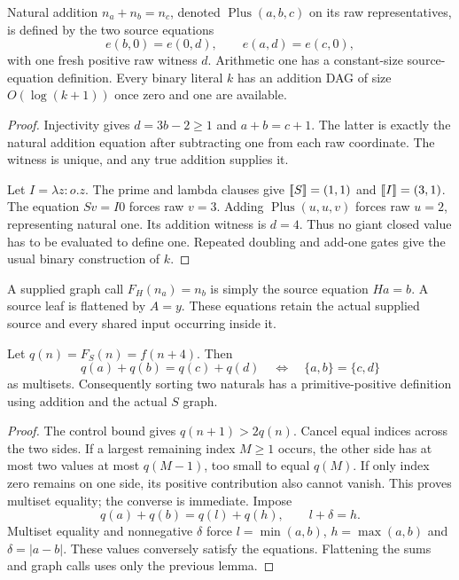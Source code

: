 \begin{lemma}\label{lem:addition}
Natural addition $n_a+n_b=n_c$, denoted $\operatorname{Plus}(a,b,c)$
on its raw representatives, is defined by the two source equations
\[
 e(b,0)=e(0,d),\qquad e(a,d)=e(c,0),
\]
with one fresh positive raw witness $d$.  Arithmetic one has a constant-size
source-equation definition.  Every binary literal $k$ has an addition DAG
of size $O(\log(k+1))$ once zero and one are available.
\end{lemma}
\begin{proof}
Injectivity gives $d=3b-2\ge1$ and $a+b=c+1$.  The latter is exactly the
natural addition equation after subtracting one from each raw coordinate.
The witness is unique, and any true addition supplies it.

Let $I=\lambda z:o.z$.  The prime and lambda clauses give
$\mathopen{[\![}S\mathclose{]\!]}=(1,1)$ and $\mathopen{[\![}I\mathclose{]\!]}=(3,1)$.  The equation $Sv=I0$ forces raw
$v=3$.  Adding $\operatorname{Plus}(u,u,v)$ forces raw $u=2$, representing
natural one.  Its addition witness is $d=4$.  Thus no giant closed value
has to be evaluated to define one.  Repeated doubling and add-one gates
give the usual binary construction of $k$.
\end{proof}

A supplied graph call $F_H(n_a)=n_b$ is simply the source equation $Ha=b$.
A source leaf is flattened by $A=y$.  These equations retain the actual
supplied source and every shared input occurring inside it.

\begin{lemma}\label{lem:sort}
Let $q(n)=F_S(n)=f(n+4)$.  Then
\[
 q(a)+q(b)=q(c)+q(d)
 \quad\Longleftrightarrow\quad\{a,b\}=\{c,d\}
\]
as multisets.  Consequently sorting two naturals has a primitive-positive
definition using addition and the actual $S$ graph.
\end{lemma}
\begin{proof}
The control bound gives $q(n+1)>2q(n)$.  Cancel equal indices across the
two sides.  If a largest remaining index $M\ge1$ occurs, the other side
has at most two values at most $q(M-1)$, too small to equal $q(M)$.
If only index zero remains on one side, its positive contribution also
cannot vanish.  This proves multiset equality; the converse is immediate.
Impose
\[
 q(a)+q(b)=q(l)+q(h),\qquad l+\delta=h.
\]
Multiset equality and nonnegative $\delta$ force $l=\min(a,b)$,
$h=\max(a,b)$ and $\delta=|a-b|$.  These values conversely satisfy the
equations.  Flattening the sums and graph calls uses only the previous lemma.
\end{proof}

